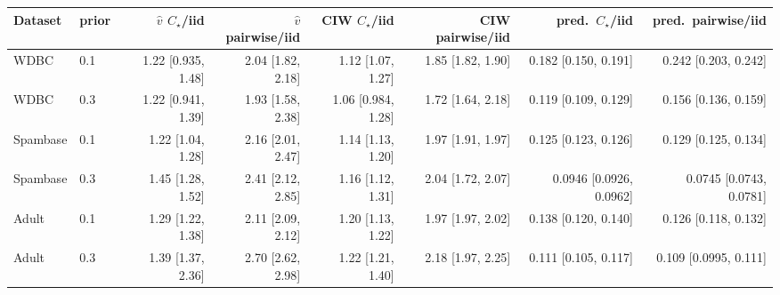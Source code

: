 \begin{tabular}{llrrrrrr}
\toprule
Dataset & prior & $\hat{v}$ $C_\star$/iid & $\hat{v}$ pairwise/iid & CIW $C_\star$/iid & CIW pairwise/iid & pred.\ $C_\star$/iid & pred.\ pairwise/iid \\
\midrule
WDBC & 0.1 & 1.22 [0.935, 1.48] & 2.04 [1.82, 2.18] & 1.12 [1.07, 1.27] & 1.85 [1.82, 1.90] & 0.182 [0.150, 0.191] & 0.242 [0.203, 0.242] \\
WDBC & 0.3 & 1.22 [0.941, 1.39] & 1.93 [1.58, 2.38] & 1.06 [0.984, 1.28] & 1.72 [1.64, 2.18] & 0.119 [0.109, 0.129] & 0.156 [0.136, 0.159] \\
Spambase & 0.1 & 1.22 [1.04, 1.28] & 2.16 [2.01, 2.47] & 1.14 [1.13, 1.20] & 1.97 [1.91, 1.97] & 0.125 [0.123, 0.126] & 0.129 [0.125, 0.134] \\
Spambase & 0.3 & 1.45 [1.28, 1.52] & 2.41 [2.12, 2.85] & 1.16 [1.12, 1.31] & 2.04 [1.72, 2.07] & 0.0946 [0.0926, 0.0962] & 0.0745 [0.0743, 0.0781] \\
Adult & 0.1 & 1.29 [1.22, 1.38] & 2.11 [2.09, 2.12] & 1.20 [1.13, 1.22] & 1.97 [1.97, 2.02] & 0.138 [0.120, 0.140] & 0.126 [0.118, 0.132] \\
Adult & 0.3 & 1.39 [1.37, 2.36] & 2.70 [2.62, 2.98] & 1.22 [1.21, 1.40] & 2.18 [1.97, 2.25] & 0.111 [0.105, 0.117] & 0.109 [0.0995, 0.111] \\
\bottomrule
\end{tabular}
